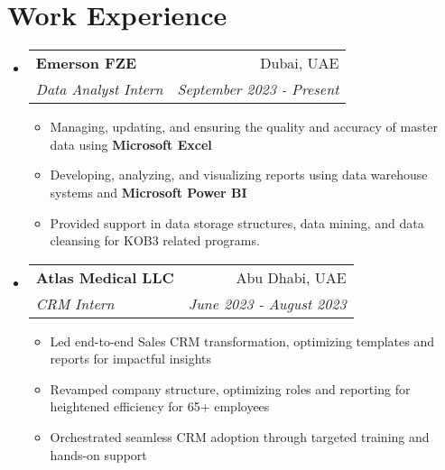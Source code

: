 \documentclass[a4paper,20pt]{article}
\makeatletter
\newcommand{\resumeItemWithoutTitle}[1] {
	\item\small{
		{#1 \vspace{-2pt}}
	}
}
\newcommand{\resumeSubheading}[4] {
	\vspace{-1pt}\item
	\begin{tabular*}{0.97\textwidth}{l@{\extracolsep{\fill}}r}
		\textbf{#1} & #2 \\
		\textit{#3} & \textit{#4} \\
	\end{tabular*}\vspace{-5pt}
}
\newcommand{\resumeSubHeadingListStart}{\begin{itemize}[leftmargin=*]}
\newcommand{\resumeSubHeadingListEnd}{\end{itemize}}
\newcommand{\resumeItemListStart}{\begin{itemize}}
\newcommand{\resumeItemListEnd}{\end{itemize}\vspace{-5pt}}
\makeatother
\begin{document}

\vspace{-5pt}
\section{Work Experience}
	\resumeSubHeadingListStart
		\resumeSubheading{Emerson FZE}{Dubai, UAE} {Data Analyst Intern}{September 2023 - Present}
		\resumeItemListStart
			\resumeItemWithoutTitle{Managing, updating, and ensuring the quality and accuracy of master data using \textbf{Microsoft Excel}}
			\resumeItemWithoutTitle{Developing, analyzing, and visualizing reports using data warehouse systems and \textbf{Microsoft Power BI}}
			\resumeItemWithoutTitle{Provided support in data storage structures, data mining, and data cleansing for KOB3 related programs.}
		\resumeItemListEnd
		\resumeSubheading{Atlas Medical LLC}{Abu Dhabi, UAE} {CRM Intern}{June 2023 - August 2023}
		\resumeItemListStart
			\resumeItemWithoutTitle{Led end-to-end Sales CRM transformation, optimizing templates and reports for impactful insights}
			\resumeItemWithoutTitle{Revamped company structure, optimizing roles and reporting for heightened efficiency for 65+ employees}
			\resumeItemWithoutTitle{Orchestrated seamless CRM adoption through targeted training and hands-on support}
		\resumeItemListEnd
	\resumeSubHeadingListEnd
\end{document}
